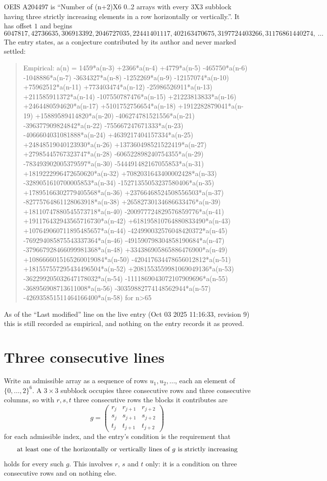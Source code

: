 \documentclass[11pt,a4paper]{article}
\theoremstyle{plain}
\theoremstyle{definition}
\begin{document}
OEIS A204497 is ``Number of (n+2)X6 0..2 arrays with every 3X3 subblock having three strictly increasing elements in a row horizontally or vertically.''. It has offset $1$ and begins
\[
6047817, 42736635, 306913392, 2046727035, 22441401117, 402163470675, 3197724403266, 31176861440274,\ \dots
\]
The entry states, as a conjecture contributed by its author and never marked settled:
\begin{quote}
Empirical: a(n) = 1459*a(n-3) +2366*a(n-4) +4779*a(n-5) -465750*a(n-6) -1048886*a(n-7) -3634327*a(n-8) -1252269*a(n-9) -12157074*a(n-10) +75962512*a(n-11) +773403474*a(n-12) -25986526911*a(n-13) +211585911372*a(n-14) -107550787476*a(n-15) +21223813833*a(n-16) +2464480594620*a(n-17) +5101752756654*a(n-18) +1912282879041*a(n-19) +15889589414820*a(n-20) -406274781521556*a(n-21) -396377909824842*a(n-22) -755667247671333*a(n-23) -4066604031081888*a(n-24) +4639217404157334*a(n-25) +24848519040123930*a(n-26) +137360498521522419*a(n-27) +27985445767323747*a(n-28) -606522898240754355*a(n-29) -783493902005379597*a(n-30) -544491482167055853*a(n-31) +1819222996472650620*a(n-32) +7082031643400002428*a(n-33) -3289051610700005853*a(n-34) -15271355053237580406*a(n-35) +17895166302779405568*a(n-36) +23766468524508556503*a(n-37) -82775764861128063918*a(n-38) +26582730134686633476*a(n-39) +18110747880545573718*a(n-40) -200977724829576859776*a(n-41) +191176432943565716730*a(n-42) +618195810764880833490*a(n-43) +107649060711895485657*a(n-44) -424990032576048420372*a(n-45) -769294085875543337364*a(n-46) -491590798304858190684*a(n-47) -379667928466099981368*a(n-48) +334386905865886476900*a(n-49) +1086666015165260019084*a(n-50) -420417634478656012812*a(n-51) +181557557295434496504*a(n-52) +2081553559981069049136*a(n-53) -362299205032647178032*a(n-54) -1111869043072107909696*a(n-55) -368956908713611008*a(n-56) -30359882774148562944*a(n-57) -426935851511464166400*a(n-58) for n>65
\end{quote}
As of the ``Last modified'' line on the live entry (Oct 03 2025 11:16:33, revision 9) this is still
recorded as empirical, and nothing on the entry records it as proved.

\section{Three consecutive lines}

Write an admissible array as a sequence of rows $u_1,u_2,\dots$, each an element of
$\{0,\dots,2\}^{6}$. A $3\times3$ subblock occupies three consecutive rows and
three consecutive columns, so with $r,s,t$ three consecutive rows the blocks it
contributes are
\[
g=\begin{pmatrix}r_j&r_{j+1}&r_{j+2}\\ s_j&s_{j+1}&s_{j+2}\\ t_j&t_{j+1}&t_{j+2}\end{pmatrix}
\]
for each admissible index, and the entry's condition is the requirement that
\[
\text{at least one}\text{ of the horizontally or vertically lines of }g\text{ \text{is strictly increasing}}
\]
holds for every such $g$. This involves $r$, $s$ and $t$ only: it is a condition on
three consecutive rows and on nothing else.
\end{document}
